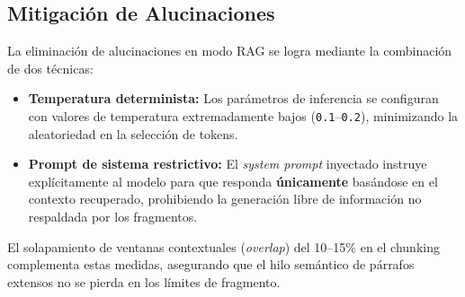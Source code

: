 \subsection{Mitigación de Alucinaciones}
La eliminación de alucinaciones en modo RAG se logra mediante la combinación de dos técnicas:
\begin{itemize}
    \item \textbf{Temperatura determinista:} Los parámetros de inferencia se configuran con valores de temperatura extremadamente bajos (\texttt{0.1}--\texttt{0.2}), minimizando la aleatoriedad en la selección de tokens.
    \item \textbf{Prompt de sistema restrictivo:} El \textit{system prompt} inyectado instruye explícitamente al modelo para que responda \textbf{únicamente} basándose en el contexto recuperado, prohibiendo la generación libre de información no respaldada por los fragmentos.
\end{itemize}

El solapamiento de ventanas contextuales (\textit{overlap}) del 10--15\% en el chunking complementa estas medidas, asegurando que el hilo semántico de párrafos extensos no se pierda en los límites de fragmento.
